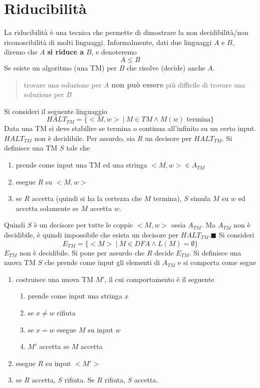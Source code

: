 \documentclass[10pt, letterpaper]{report}
\begin{document}
\section{Riducibilità}
La riducibilità è una tecnica che permette di dimostrare la non decidibilità/non riconoscibilità di molti linguaggi. Informalmente, dati due linguaggi $A$ e $B$,  diremo che $A$ \textbf{si riduce a} $B$, e denoteremo $$ A\le B$$ Se esiste un algoritmo (una TM) per $B$ che risolve (decide) anche $A$.\begin{quotation}
    trovare una soluzione per $A$ \textbf{non può essere} più difficile di trovare una soluzione per $B$
\end{quotation}
Si consideri il seguente linguaggio 
$$ HALT_{TM}=\{<M,w> \ | \ M\in TM\land M(w)\text{ termina} \}$$
Data una TM si deve stabilire se termina o continua all'infinito su un certo input.\acc 
{} $HALT_{TM}$ non è decidibile.\acc 
\dimo{} Per assurdo, sia $R$ un decisore per $HALT_{TM}$. Si definisce una TM $S$ tale che \begin{enumerate}
    \item prende come input una TM ed una stringa $<M,w>\in A_{TM}$
    \item esegue $R$ su $<M,w>$
    \item se $R$ accetta (quindi si ha la certezza che $M$ termina), $S$ simula $M$ su $w$ ed accetta solamente se $M$ accetta $w$.
\end{enumerate}
Quindi $S$ è un decisore per tutte le coppie $<M,w>$ ossia $A_{TM}$. Ma $A_{TM}$ non è decidibile, è quindi impossibile che esista un decisore per $HALT_{TM}$.\hfill$\blacksquare$\acc 
Si consideri 
$$ E_{TM}=\{<M>\ | \ M\in DFA \land L(M)=\emptyset\}$$
\prop{} $E_{TM}$ non è decidibile.\acc 
\dimo{} Si pone per assurdo che $R$ decide $E_{TM}$. Si definisce una nuova TM $S$ che prende come input gli elementi di $A_{TM}$ e si comporta come segue \begin{enumerate}
    \item costruisce una nuova TM $M'$, il cui comportamento è il seguente\begin{enumerate}
        \item prende come input una stringa $x$
        \item se $x\ne w$ rifiuta 
        \item se $x=w$ esegue $M$ su input $w$
        \item $M'$ accetta se $M$ accetta
    \end{enumerate}
    \item esegue $R$ su input $<M'>$
    \item se $R$ accetta, $S$ rifiuta. Se $R$ rifiuta, $S$ accetta.
\end{enumerate}
\end{document}
